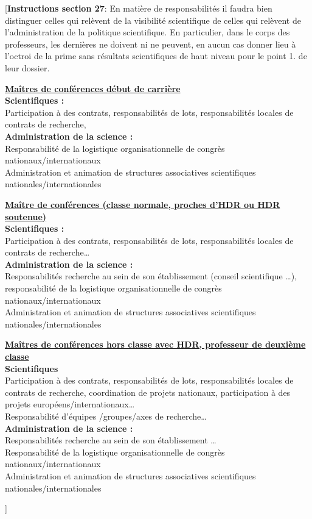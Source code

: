 \documentclass[a4paper,10pt]{article}
\newcommand{\instructionsSection}[1]{{\color{blue}[\textbf{Instructions section 27}: #1]}}
\newcommand{\instructionsSection}[1]{}
\begin{document}
\instructionsSection{
En matière de responsabilités il faudra bien distinguer celles qui relèvent de la visibilité scientifique de celles qui relèvent de l'administration de la politique scientifique. En particulier, dans le corps des professeurs, les dernières ne doivent ni ne peuvent, en aucun cas donner lieu à l'octroi de la prime sans résultats scientifiques de haut niveau pour le point 1. de leur dossier.

\bigskip

\textbf{\underline{Maîtres de conférences début de carrière}}\\
\textbf{Scientifiques :}\\
Participation à des contrats, responsabilités de lots, responsabilités locales de contrats de recherche, \\
\textbf{Administration de la science :}\\
Responsabilité de la logistique organisationnelle de congrès nationaux/internationaux\\
Administration et animation de structures associatives scientifiques nationales/internationales

\bigskip

\textbf{\underline{Maître de conférences (classe normale, proches d'HDR ou HDR soutenue)}}\\
\textbf{Scientifiques :}\\
Participation à des contrats, responsabilités de lots, responsabilités locales de contrats de recherche… \\
\textbf{Administration de la science :}\\
Responsabilités recherche au sein de son établissement (conseil scientifique …), responsabilité de la logistique organisationnelle de congrès nationaux/internationaux\\
Administration et animation de structures associatives scientifiques nationales/internationales

\bigskip

\textbf{\underline{Maîtres de conférences hors classe avec HDR, professeur de deuxième classe}}\\
\textbf{Scientifiques}\\
Participation à des contrats, responsabilités de lots, responsabilités locales de contrats de recherche, coordination de projets nationaux, participation à des projets européens/internationaux…\\
Responsabilité d'équipes /groupes/axes de recherche…\\
\textbf{Administration de la science :}\\
Responsabilités recherche au sein de son établissement …\\
Responsabilité de la logistique organisationnelle de congrès nationaux/internationaux\\
Administration et animation de structures associatives scientifiques nationales/internationales

}
\end{document}

